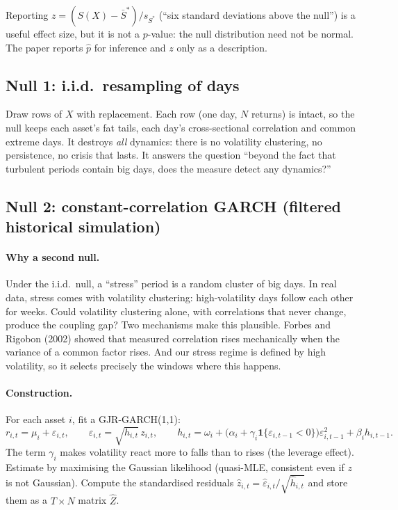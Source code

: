 \begin{piege}
Reporting $z=(S(X)-\bar S^*)/s_{S^*}$ (``six standard deviations above the
null'') is a useful effect size, but it is not a $p$-value: the null
distribution need not be normal. The paper reports $\hat p$ for inference and
$z$ only as a description.
\end{piege}

\subsection{Null 1: i.i.d.\ resampling of days}

Draw rows of $X$ with replacement. Each row (one day, $N$ returns) is intact,
so the null keeps each asset's fat tails, each day's cross-sectional
correlation and common extreme days. It destroys \emph{all} dynamics: there
is no volatility clustering, no persistence, no crisis that lasts. It answers
the question ``beyond the fact that turbulent periods contain big days, does
the measure detect any dynamics?''

\subsection{Null 2: constant-correlation GARCH (filtered historical simulation)}

\paragraph{Why a second null.} Under the i.i.d.\ null, a ``stress'' period is
a random cluster of big days. In real data, stress comes with volatility
clustering: high-volatility days follow each other for weeks. Could
volatility clustering alone, with correlations that never change, produce the
coupling gap? Two mechanisms make this plausible. Forbes and Rigobon (2002)
showed that measured correlation rises mechanically when the variance of a
common factor rises. And our stress regime is defined by high volatility, so
it selects precisely the windows where this happens.

\paragraph{Construction.} For each asset $i$, fit a GJR-GARCH(1,1):
\[
r_{i,t}=\mu_i+\varepsilon_{i,t},\qquad \varepsilon_{i,t}=\sqrt{h_{i,t}}\,z_{i,t},\qquad
h_{i,t}=\omega_i+\bigl(\alpha_i+\gamma_i\mathbf 1\{\varepsilon_{i,t-1}<0\}\bigr)\varepsilon_{i,t-1}^2+\beta_ih_{i,t-1}.
\]
The term $\gamma_i$ makes volatility react more to falls than to rises (the
leverage effect). Estimate by maximising the Gaussian likelihood (quasi-MLE,
consistent even if $z$ is not Gaussian). Compute the standardised residuals
$\hat z_{i,t}=\hat\varepsilon_{i,t}/\sqrt{\hat h_{i,t}}$ and store them as a
$T\times N$ matrix $\hat Z$.


